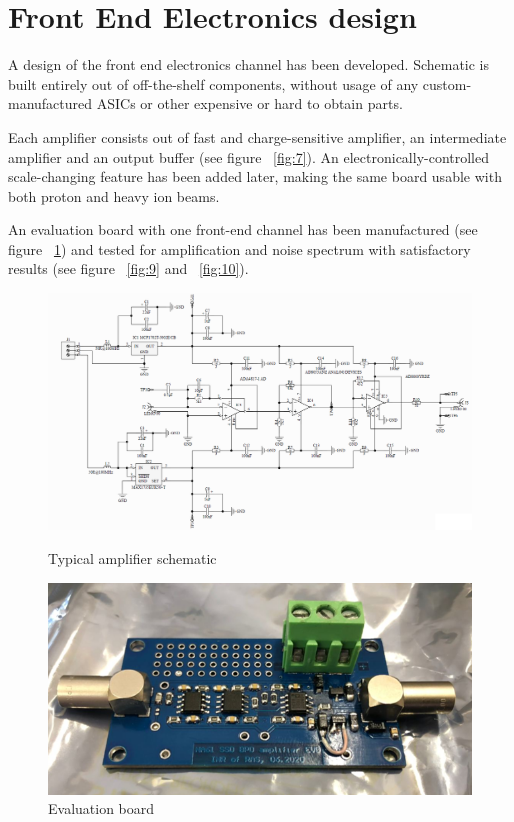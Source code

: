 \documentclass[a4paper]{jpconf}
\begin{document}
\section{Front End Electronics design}
A design of the front end electronics channel has been developed. Schematic is built entirely out of off-the-shelf components, without usage of any custom-manufactured ASICs or other expensive or hard to obtain parts.

Each amplifier consists out of fast and charge-sensitive amplifier, an intermediate amplifier and an output buffer (see figure ~\ref{fig:7}). An electronically-controlled scale-changing feature has been added later, making the same board usable with both proton and heavy ion beams.

An evaluation board with one front-end channel has been manufactured (see figure ~\ref{fig:8}) and tested for amplification and noise spectrum with satisfactory results (see figure ~\ref{fig:9} and ~\ref{fig:10}).
\begin{figure}[htbp]
	\begin{minipage}{20pc}
		\includegraphics[width=\textwidth]{schematic.png}
		\caption{\label{fig:7} Typical amplifier schematic}
	\end{minipage}\hspace{2pc}
	\begin{minipage}{20pc}
		\includegraphics[width=\textwidth]{amp_photo.png}
		\caption{\label{fig:8} Evaluation board}
	\end{minipage} 
\end{figure}
\end{document}
